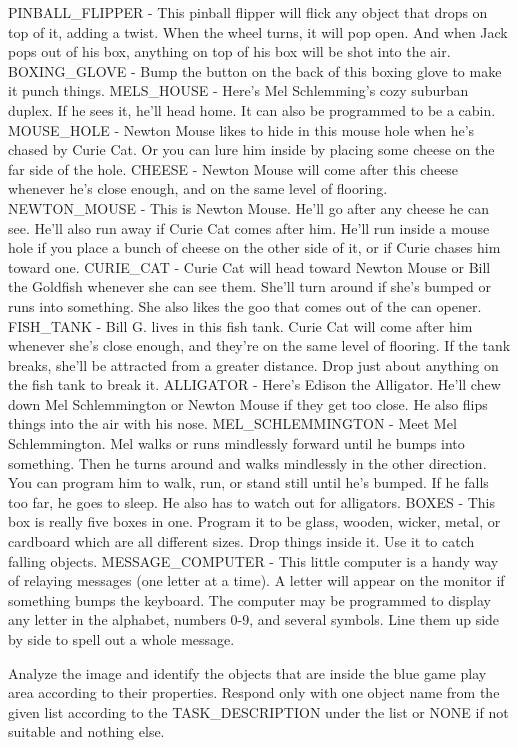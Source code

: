 PINBALL_FLIPPER - This pinball flipper will flick any object that drops on top of it, adding a twist. When the wheel turns, it will pop open. And when Jack pops out of his box, anything on top of his box will be shot into the air.
BOXING_GLOVE - Bump the button on the back of this boxing glove to make it punch things.
MELS_HOUSE - Here's Mel Schlemming's cozy suburban duplex. If he sees it, he'll head home. It can also be programmed to be a cabin.
MOUSE_HOLE - Newton Mouse likes to hide in this mouse hole when he's chased by Curie Cat. Or you can lure him inside by placing some cheese on the far side of the hole.
CHEESE - Newton Mouse will come after this cheese whenever he's close enough, and on the same level of flooring.
NEWTON_MOUSE - This is Newton Mouse. He'll go after any cheese he can see. He'll also run away if Curie Cat comes after him. He'll run inside a mouse hole if you place a bunch of cheese on the other side of it, or if Curie chases him toward one.
CURIE_CAT - Curie Cat will head toward Newton Mouse or Bill the Goldfish whenever she can see them. She'll turn around if she's bumped or runs into something. She also likes the goo that comes out of the can opener.
FISH_TANK - Bill G. lives in this fish tank. Curie Cat will come after him whenever she's close enough, and they're on the same level of flooring. If the tank breaks, she'll be attracted from a greater distance. Drop just about anything on the fish tank to break it.
ALLIGATOR - Here's Edison the Alligator. He'll chew down Mel Schlemmington or Newton Mouse if they get too close. He also flips things into the air with his nose.
MEL_SCHLEMMINGTON - Meet Mel Schlemmington. Mel walks or runs mindlessly forward until he bumps into something. Then he turns around and walks mindlessly in the other direction. You can program him to walk, run, or stand still until he's bumped. If he falls too far, he goes to sleep. He also has to watch out for alligators.
BOXES - This box is really five boxes in one. Program it to be glass, wooden, wicker, metal, or cardboard which are all different sizes. Drop things inside it. Use it to catch falling objects.
MESSAGE_COMPUTER - This little computer is a handy way of relaying messages (one letter at a time). A letter will appear on the monitor if something bumps the keyboard. The computer may be programmed to display any letter in the alphabet, numbers 0-9, and several symbols. Line them up side by side to spell out a whole message.


Analyze the image and identify the objects that are inside the blue game play area according to their properties.
Respond only with one object name from the given list according to the TASK_DESCRIPTION under the list or NONE if not suitable and nothing else.

